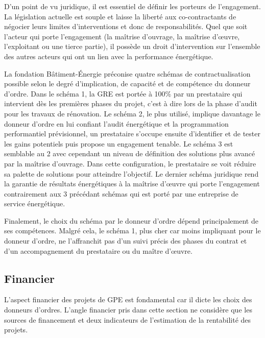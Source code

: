 D'un point de vu juridique, il est essentiel de définir les porteurs de l'engagement. La législation actuelle est souple et laisse la liberté aux co-contractants de négocier leurs limites d'interventions et donc de responsabilités. Quel que soit l'acteur qui porte l'engagement (la maîtrise d'ouvrage, la maîtrise d'œuvre, l'exploitant ou une tierce partie), il possède un droit d'intervention sur l'ensemble des autres acteurs qui ont un lien avec la performance énergétique.

La fondation Bâtiment-Énergie \cite{FBE-16} préconise quatre schémas de contractualisation possible selon le degré d'implication, de capacité et de compétence du donneur d'ordre. Dans le schéma 1, la GRE est portée à 100\% par un prestataire qui intervient dès les premières phases du projet, c'est à dire lors de la phase d'audit pour les travaux de rénovation. Le schéma 2, le plus utilisé, implique davantage le donneur d'ordre en lui confiant l'audit énergétique et la programmation performantiel prévisionnel, un prestataire s'occupe ensuite d'identifier et de tester les gains potentiels puis propose un engagement tenable. Le schéma 3 est semblable au 2 avec cependant un niveau de définition des solutions plus avancé par la maîtrise d'ouvrage. Dans cette configuration, le prestataire se voit réduire sa palette de solutions pour atteindre l'objectif. Le dernier schéma juridique rend la garantie de résultats énergétiques à la maîtrise d'œuvre qui porte l'engagement contrairement aux 3 précédant schémas qui est porté par une entreprise de service énergétique. 

Finalement, le choix du schéma par le donneur d'ordre dépend principalement de ses compétences. Malgré cela, le schéma 1, plus cher car moins impliquant pour le donneur d'ordre, ne l'affranchit pas d'un suivi précis des phases du contrat et d'un accompagnement du prestataire ou du maître d'œuvre.

\subsection{Financier}

L'aspect financier des projets de GPE est fondamental car il dicte les choix des donneurs d'ordres. L'angle financier pris dans cette section ne considère que les sources de financement et deux indicateurs de l'estimation de la rentabilité des projets.


